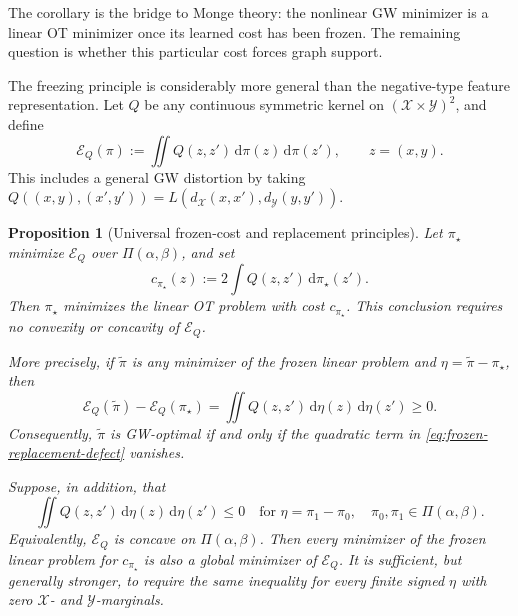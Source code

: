 \documentclass[11pt,a4paper]{article}
\newtheorem{proposition}[theorem]{Proposition}
\theoremstyle{definition}
\theoremstyle{remark}
\newcommand{\Ecal}{\mathcal E}
\newcommand{\Piopt}{\Pi}
\newcommand{\dd}{\,\mathrm d}
\begin{document}
The corollary is the bridge to Monge theory: the nonlinear GW minimizer is a
linear OT minimizer once its learned cost has been frozen.  The remaining
question is whether this particular cost forces graph support.

The freezing principle is considerably more general than the negative-type
feature representation.  Let \(Q\) be any continuous symmetric kernel on
\((\mathcal X\times\mathcal Y)^2\), and define
\begin{equation}
  \Ecal_Q(\pi):=\iint Q(z,z')\dd\pi(z)\dd\pi(z'),
  \qquad z=(x,y).
  \label{eq:abstract-quadratic-gw}
\end{equation}
This includes a general GW distortion by taking
\(
 Q((x,y),(x',y'))=L(d_{\mathcal X}(x,x'),d_{\mathcal Y}(y,y')).
\)

\begin{proposition}[Universal frozen-cost and replacement principles]
\label{prop:universal-frozen-gw}
Let \(\pi_\star\) minimize \(\Ecal_Q\) over \(\Piopt(\alpha,\beta)\), and set
\begin{equation}
  c_{\pi_\star}(z)
  :=2\int Q(z,z')\dd\pi_\star(z').
  \label{eq:abstract-frozen-gw-cost}
\end{equation}
Then \(\pi_\star\) minimizes the linear OT problem with cost
\(c_{\pi_\star}\).  This conclusion requires no convexity or concavity of
\(\Ecal_Q\).

More precisely, if \(\widetilde\pi\) is any minimizer of the frozen linear
problem and \(\eta=\widetilde\pi-\pi_\star\), then
\begin{equation}
  \Ecal_Q(\widetilde\pi)-\Ecal_Q(\pi_\star)
  =\iint Q(z,z')\dd\eta(z)\dd\eta(z')\geq0.
  \label{eq:frozen-replacement-defect}
\end{equation}
Consequently, \(\widetilde\pi\) is GW-optimal if and only if the quadratic
term in \eqref{eq:frozen-replacement-defect} vanishes.

Suppose, in addition, that
\begin{equation}
  \iint Q(z,z')\dd\eta(z)\dd\eta(z')\leq0
  \quad\text{for }\eta=\pi_1-\pi_0,
  \quad \pi_0,\pi_1\in\Piopt(\alpha,\beta).
  \label{eq:conditional-concavity-gw-kernel}
\end{equation}
Equivalently, \(\Ecal_Q\) is concave on
\(\Piopt(\alpha,\beta)\).  Then every minimizer of the frozen linear problem
for \(c_{\pi_\star}\) is also a global minimizer of \(\Ecal_Q\).
It is sufficient, but generally stronger, to require the same inequality for
every finite signed \(\eta\) with zero \(\mathcal X\)- and
\(\mathcal Y\)-marginals.
\end{proposition}
\end{document}
